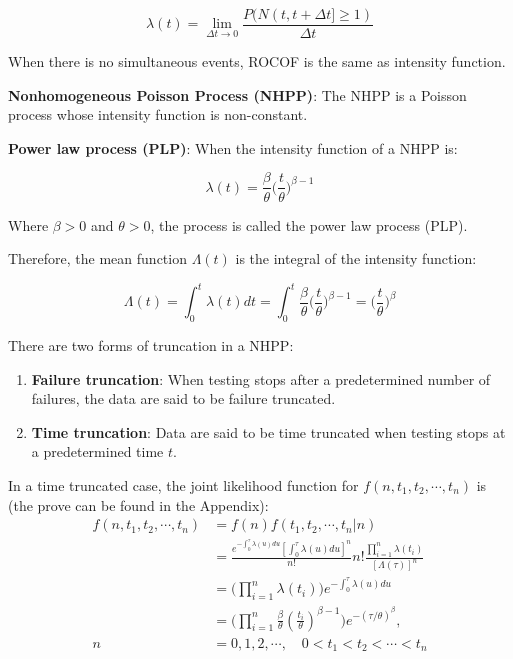 \documentclass[12pt]{book}
\numberwithin{equation}{chapter}
\providecommand{\tightlist}{%
  \setlength{\itemsep}{0pt}\setlength{\parskip}{0pt}}
\begin{document}
\[\lambda(t) = \lim_{\Delta t \rightarrow 0}\frac{P(N(t, t+\Delta t] \geq 1)}{\Delta t}\]

When there is no simultaneous events, ROCOF is the same as intensity function.

\textbf{Nonhomogeneous Poisson Process (NHPP)}: The NHPP is a Poisson process whose intensity function is non-constant.

\textbf{Power law process (PLP)}: When the intensity function of a NHPP is:

\[\lambda(t) = \frac{\beta}{\theta}\bigg(\frac{t}{\theta}\bigg)^{\beta-1}\]

Where \(\beta > 0\) and \(\theta > 0\), the process is called the power law process (PLP).

Therefore, the mean function \(\Lambda(t)\) is the integral of the intensity function:

\[\Lambda(t) = \int_0^t \lambda(t)dt = \int_0^t \frac{\beta}{\theta}\bigg(\frac{t}{\theta}\bigg)^{\beta-1} = \bigg(\frac{t}{\theta}\bigg)^{\beta}\]

There are two forms of truncation in a NHPP:

\begin{enumerate}
\def\labelenumi{\arabic{enumi}.}
\tightlist
\item
  \textbf{Failure truncation}: When testing stops after a predetermined number of failures, the data are said to be failure truncated.
\item
  \textbf{Time truncation}: Data are said to be time truncated when testing stops at a predetermined time \(t\).
\end{enumerate}

In a time truncated case, the joint likelihood function for \(f(n, t_1, t_2, \cdots, t_n)\) is (the prove can be found in the Appendix):
\begin{equation}\label{pdftau}
\begin{aligned}
f(n, t_1, t_2, \cdots, t_n) & = f(n)f(t_1, t_2, \cdots, t_n|n)\\
& = \frac{e^{-\int_0^\tau \lambda(u)du}[\int_0^\tau \lambda(u)du]^n}{n!}n!\frac{\prod_{i=1}^n\lambda(t_i)}{[\Lambda(\tau)]^n}\\
& = \Big(\prod_{i=1}^n\lambda(t_i) \Big)e^{-\int_0^\tau \lambda(u)du}\\
& = \Big(\prod_{i=1}^n\frac{\beta}{\theta}(\frac{t_i}{\theta})^{\beta - 1} \Big)e^{-(\tau/\theta)^\beta},\\ 
n & = 0, 1, 2, \cdots, \quad  0 < t_1 < t_2 < \cdots < t_n
\end{aligned}
\end{equation}
\end{document}
